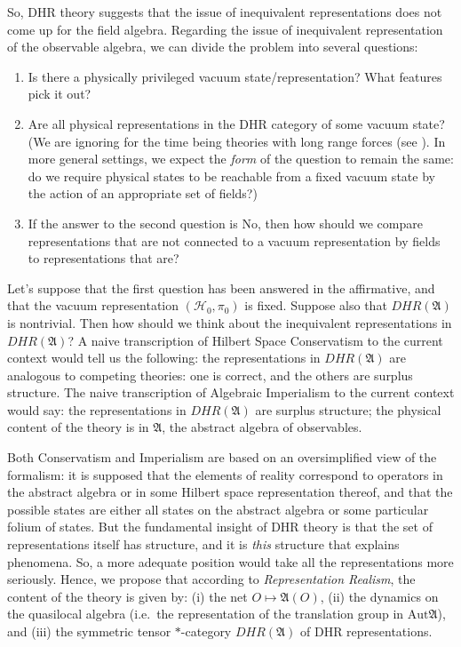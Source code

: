 \documentclass[12pt]{article}
\theoremstyle{definition}
\theoremstyle{definition}
\theoremstyle{remark}
\def\2#1{{\mathcal #1}}
\def\al#1{{\mathfrak #1}}
\newcommand{\Aut}{\mathrm{Aut}}
\begin{document}
So, DHR theory suggests that the issue of inequivalent representations
does not come up for the field algebra.  Regarding the issue of
inequivalent representation of the observable algebra, we can divide
the problem into several questions: 

\begin{enumerate}
\item Is there a physically privileged vacuum state/representation?
  What features pick it out?
\item Are all physical representations in the DHR category of some
  vacuum state?  (We are ignoring for the time being theories with
  long range forces (see \cite{buch-fred}).  In more general settings,
  we expect the \emph{form} of the question to remain the same: do we
  require physical states to be reachable from a fixed vacuum state by
  the action of an appropriate set of fields?)
\item If the answer to the second question is No, then how should we
  compare representations that are not connected to a vacuum
  representation by fields to representations that are?
\end{enumerate}

Let's suppose that the first question has been answered in the
affirmative, and that the vacuum representation $(\2H _0,\pi _0 )$ is
fixed.  Suppose also that $DHR(\al A)$ is nontrivial.  Then how should
we think about the inequivalent representations in $DHR(\al A)$?  A
naive transcription of Hilbert Space Conservatism to the current
context would tell us the following: the representations in $DHR(\al
A)$ are analogous to competing theories: one is correct, and the
others are surplus structure.  The naive transcription of Algebraic
Imperialism to the current context would say: the representations in
$DHR(\al A)$ are surplus structure; the physical content of the theory
is in $\al A$, the abstract algebra of observables.

Both Conservatism and Imperialism are based on an
oversimplified view of the formalism: it is supposed
that the elements of reality correspond to operators in
the abstract algebra or in some Hilbert space
representation thereof, and that the possible states
are either all states on the abstract algebra or some
particular folium of states.  But the fundamental
insight of DHR theory is that the set of
representations itself has structure, and it is
\emph{this} structure that explains phenomena.  So, a
more adequate position would take all the
representations more seriously.  Hence, we propose that
according to \emph{Representation Realism}, the content
of the theory is given by: (i) the net $O\mapsto \al
A(O)$, (ii) the dynamics on the quasilocal algebra
(i.e.\ the representation of the translation group in
$\Aut \al A$), and (iii) the symmetric tensor
$*$-category $DHR(\al A)$ of DHR representations.
\end{document}
